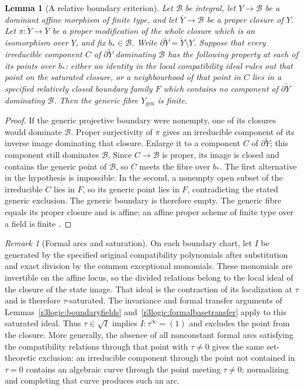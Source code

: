 \documentclass[11pt,a4paper]{article}
\numberwithin{equation}{section}
\theoremstyle{plain}
\newtheorem{lemma}[theorem]{Lemma}
\theoremstyle{definition}
\theoremstyle{remark}
\newtheorem{remark}[theorem]{Remark}
\begin{document}
\begin{lemma}[A relative boundary criterion]
\label{r3logic:propercriterion}
Let $\mathscr B$ be integral, let $Y\to \mathscr B$ be a dominant affine morphism of
finite type, and let $\overline Y\to \mathscr B$ be a proper closure of $Y$.
Let $\pi:\widetilde Y\to\overline Y$ be a proper modification of
the whole closure which is an isomorphism over $Y$, and fix
$b_\ast\in \mathscr B$. Write $\partial\widetilde Y=\widetilde Y\setminus Y$.
Suppose that every irreducible component $C$ of $\partial\widetilde Y$ dominating $\mathscr B$
has the following property at each of its points over $b_\ast$:
either an identity in the local compatibility ideal rules out that
point on the saturated closure, or a neighbourhood of that point
in $C$ lies in a specified relatively closed boundary family $F$
which contains no component of $\partial\widetilde Y$ dominating $\mathscr B$. Then the generic fibre $Y_{\mathrm{gen}}$ is finite.
\end{lemma}
\begin{proof}
If the generic projective boundary were nonempty, one of its
closures would dominate $\mathscr B$. Proper surjectivity of $\pi$ gives
an irreducible component of its inverse image dominating that
closure. Enlarge it to a component $C$ of $\partial\widetilde Y$; this component
still dominates $\mathscr B$. Since $C\to \mathscr B$ is proper, its image is closed
and contains the generic point of $\mathscr B$, so $C$ meets the fibre
over $b_\ast$. The first alternative in the hypothesis is impossible.
In the second, a nonempty open subset of the irreducible $C$ lies
in $F$, so its generic point lies in $F$, contradicting the stated
generic exclusion. The generic boundary is therefore empty.
The generic fibre equals its proper closure and is affine; an
affine proper scheme of finite type over a field is finite
\cite[Lemma~29.45.11, Tag~01WN]{StacksProject}.
\end{proof}

\begin{remark}[Formal arcs and saturation]
On each boundary chart, let $I$ be generated by the specified original
compatibility polynomials after substitution and exact division by the common
exceptional monomials. These monomials are invertible on the affine locus,
so the divided relations belong to the local ideal of the closure of the state image.
That ideal is the contraction of its localization at $\tau$ and is
therefore $\tau$-saturated. The invariance and formal transfer arguments
of Lemmas~\ref{r3logic:boundaryfields} and~\ref{r3logic:formalbasetransfer}
apply to this saturated ideal. Thus $\tau\in\sqrt I$ implies
$I:\tau^\infty=(1)$ and excludes the point from the closure. More generally, the
absence of all nonconstant formal arcs satisfying the compatibility relations through that point
with $\tau\ne0$ gives the same set-theoretic exclusion: an
irreducible component through the point not contained in $\tau=0$
contains an algebraic curve through the point meeting $\tau\ne0$;
normalizing and completing that curve produces such an arc.
\end{remark}
\end{document}
